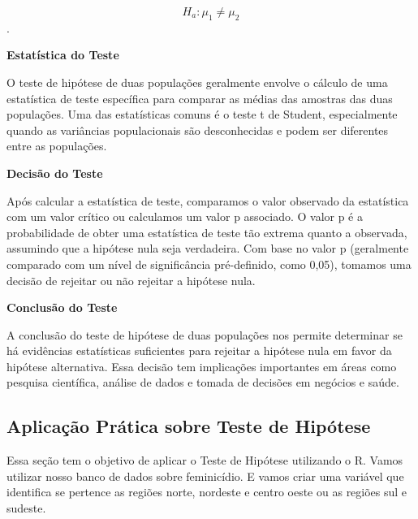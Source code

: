 \documentclass[
  letterpaper,
  DIV=11,
  numbers=noendperiod]{scrreprt}
\begin{document}
\[H_a: \mu_1 \neq \mu_2\].

\textbf{Estatística do Teste}

O teste de hipótese de duas populações geralmente envolve o cálculo de
uma estatística de teste específica para comparar as médias das amostras
das duas populações. Uma das estatísticas comuns é o teste t de Student,
especialmente quando as variâncias populacionais são desconhecidas e
podem ser diferentes entre as populações.

\textbf{Decisão do Teste}

Após calcular a estatística de teste, comparamos o valor observado da
estatística com um valor crítico ou calculamos um valor p associado. O
valor p é a probabilidade de obter uma estatística de teste tão extrema
quanto a observada, assumindo que a hipótese nula seja verdadeira. Com
base no valor p (geralmente comparado com um nível de significância
pré-definido, como 0,05), tomamos uma decisão de rejeitar ou não
rejeitar a hipótese nula.

\textbf{Conclusão do Teste}

A conclusão do teste de hipótese de duas populações nos permite
determinar se há evidências estatísticas suficientes para rejeitar a
hipótese nula em favor da hipótese alternativa. Essa decisão tem
implicações importantes em áreas como pesquisa científica, análise de
dados e tomada de decisões em negócios e saúde.

\subsection{Aplicação Prática sobre Teste de
Hipótese}\label{aplicauxe7uxe3o-pruxe1tica-sobre-teste-de-hipuxf3tese}

Essa seção tem o objetivo de aplicar o Teste de Hipótese utilizando o R.
Vamos utilizar nosso banco de dados sobre feminicídio. E vamos criar uma
variável que identifica se pertence as regiões norte, nordeste e centro
oeste ou as regiões sul e sudeste.
\end{document}
